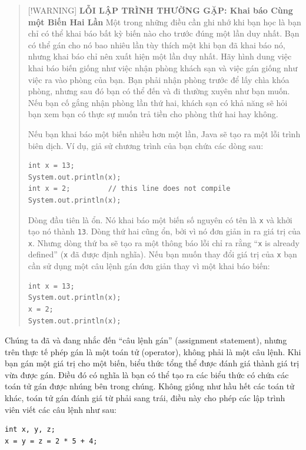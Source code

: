 \begin{quote}
{[}!WARNING{]} \textbf{LỖI LẬP TRÌNH THƯỜNG GẶP: Khai báo Cùng một Biến
Hai Lần} Một trong những điều cần ghi nhớ khi bạn học là bạn chỉ có thể
khai báo bất kỳ biến nào cho trước đúng một lần duy nhất. Bạn có thể gán
cho nó bao nhiêu lần tùy thích một khi bạn đã khai báo nó, nhưng khai
báo chỉ nên xuất hiện một lần duy nhất. Hãy hình dung việc khai báo biến
giống như việc nhận phòng khách sạn và việc gán giống như việc ra vào
phòng của bạn. Bạn phải nhận phòng trước để lấy chìa khóa phòng, nhưng
sau đó bạn có thể đến và đi thường xuyên như bạn muốn. Nếu bạn cố gắng
nhận phòng lần thứ hai, khách sạn có khả năng sẽ hỏi bạn xem bạn có thực
sự muốn trả tiền cho phòng thứ hai hay không.

Nếu bạn khai báo một biến nhiều hơn một lần, Java sẽ tạo ra một lỗi
trình biên dịch. Ví dụ, giả sử chương trình của bạn chứa các dòng sau:

\begin{verbatim}
int x = 13;
System.out.println(x);
int x = 2;         // this line does not compile
System.out.println(x);
\end{verbatim}

Dòng đầu tiên là ổn. Nó khai báo một biến số nguyên có tên là \texttt{x}
và khởi tạo nó thành \texttt{13}. Dòng thứ hai cũng ổn, bởi vì nó đơn
giản in ra giá trị của \texttt{x}. Nhưng dòng thứ ba sẽ tạo ra một thông
báo lỗi chỉ ra rằng ``\texttt{x} is already defined'' (\texttt{x} đã
được định nghĩa). Nếu bạn muốn thay đổi giá trị của \texttt{x} bạn cần
sử dụng một câu lệnh gán đơn giản thay vì một khai báo biến:

\begin{verbatim}
int x = 13;
System.out.println(x);
x = 2;
System.out.println(x);
\end{verbatim}
\end{quote}

Chúng ta đã và đang nhắc đến ``câu lệnh gán'' (assignment statement),
nhưng trên thực tế phép gán là một toán tử (operator), không phải là một
câu lệnh. Khi bạn gán một giá trị cho một biến, biểu thức tổng thể được
đánh giá thành giá trị vừa được gán. Điều đó có nghĩa là bạn có thể tạo
ra các biểu thức có chứa các toán tử gán được nhúng bên trong chúng.
Không giống như hầu hết các toán tử khác, toán tử gán đánh giá từ phải
sang trái, điều này cho phép các lập trình viên viết các câu lệnh như
sau:

\begin{verbatim}
int x, y, z;
x = y = z = 2 * 5 + 4;
\end{verbatim}

